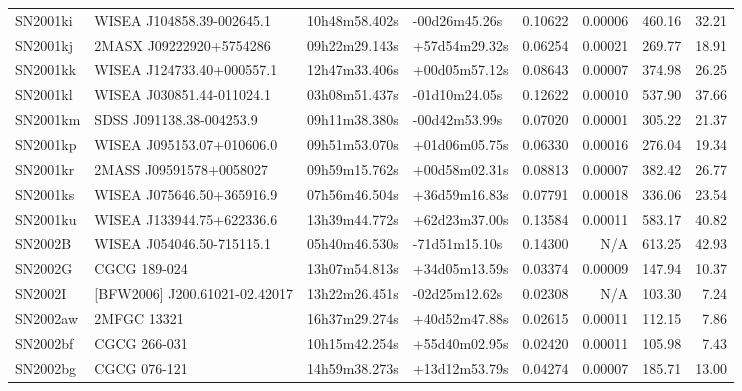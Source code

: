 \begin{longtable}{llllrrrr}
SN2001ki         &       WISEA J104858.39-002645.1 &   10h48m58.402s &   -00d26m45.26s &  0.10622 &  0.00006 &   460.16 &       32.21 \\
SN2001kj         &         2MASX J09222920+5754286 &   09h22m29.143s &   +57d54m29.32s &  0.06254 &  0.00021 &   269.77 &       18.91 \\
SN2001kk         &       WISEA J124733.40+000557.1 &   12h47m33.406s &   +00d05m57.12s &  0.08643 &  0.00007 &   374.98 &       26.25 \\
SN2001kl         &       WISEA J030851.44-011024.1 &   03h08m51.437s &   -01d10m24.05s &  0.12622 &  0.00010 &   537.90 &       37.66 \\
SN2001km         &        SDSS J091138.38-004253.9 &   09h11m38.380s &   -00d42m53.99s &  0.07020 &  0.00001 &   305.22 &       21.37 \\
SN2001kp         &       WISEA J095153.07+010606.0 &   09h51m53.070s &   +01d06m05.75s &  0.06330 &  0.00016 &   276.04 &       19.34 \\
SN2001kr         &         2MASS J09591578+0058027 &   09h59m15.762s &   +00d58m02.31s &  0.08813 &  0.00007 &   382.42 &       26.77 \\
SN2001ks         &       WISEA J075646.50+365916.9 &   07h56m46.504s &   +36d59m16.83s &  0.07791 &  0.00018 &   336.06 &       23.54 \\
SN2001ku         &       WISEA J133944.75+622336.6 &   13h39m44.772s &   +62d23m37.00s &  0.13584 &  0.00011 &   583.17 &       40.82 \\
SN2002B          &       WISEA J054046.50-715115.1 &   05h40m46.530s &   -71d51m15.10s &  0.14300 &      N/A &   613.25 &       42.93 \\
SN2002G          &                    CGCG 189-024 &   13h07m54.813s &   +34d05m13.59s &  0.03374 &  0.00009 &   147.94 &       10.37 \\
SN2002I          &  [BFW2006] J200.61021-02.42017  &   13h22m26.451s &   -02d25m12.62s &  0.02308 &      N/A &   103.30 &        7.24 \\
SN2002aw         &                     2MFGC 13321 &   16h37m29.274s &   +40d52m47.88s &  0.02615 &  0.00011 &   112.15 &        7.86 \\
SN2002bf         &                    CGCG 266-031 &   10h15m42.254s &   +55d40m02.95s &  0.02420 &  0.00011 &   105.98 &        7.43 \\
SN2002bg         &                    CGCG 076-121 &   14h59m38.273s &   +13d12m53.79s &  0.04274 &  0.00007 &   185.71 &       13.00 \\

\end{longtable}
